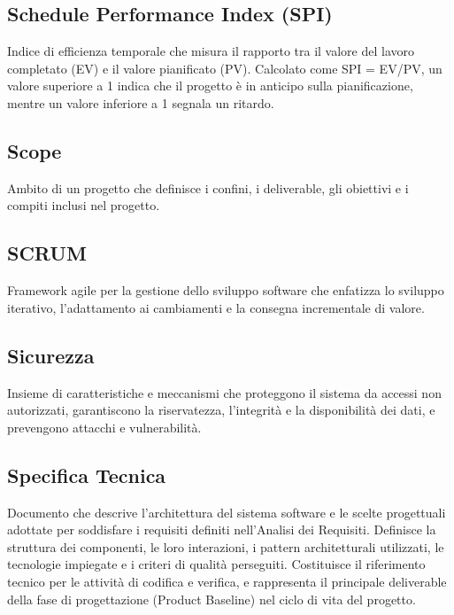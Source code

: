 \documentclass[a4paper,11pt]{article}
\begin{document}
\subsection{Schedule Performance Index (SPI)}
Indice di efficienza temporale che misura il rapporto tra il valore del lavoro completato (EV) e il valore pianificato (PV). Calcolato come SPI = EV/PV, un valore superiore a 1 indica che il progetto è in anticipo sulla pianificazione, mentre un valore inferiore a 1 segnala un ritardo.







\subsection{Scope}
Ambito di un progetto che definisce i confini, i deliverable, gli obiettivi e i compiti inclusi nel progetto.









\subsection{SCRUM}
Framework agile per la gestione dello sviluppo software che enfatizza lo sviluppo iterativo, l'adattamento ai cambiamenti e la consegna incrementale di valore.









\subsection{Sicurezza}
Insieme di caratteristiche e meccanismi che proteggono il sistema da accessi non autorizzati, garantiscono la riservatezza, l'integrità e la disponibilità dei dati, e prevengono attacchi e vulnerabilità.









\subsection{Specifica Tecnica}
Documento che descrive l'architettura del sistema software e le scelte progettuali adottate per soddisfare i requisiti definiti nell'Analisi dei Requisiti. Definisce la struttura dei componenti, le loro interazioni, i pattern architetturali utilizzati, le tecnologie impiegate e i criteri di qualità perseguiti. Costituisce il riferimento tecnico per le attività di codifica e verifica, e rappresenta il principale deliverable della fase di progettazione (Product Baseline) nel ciclo di vita del progetto.
\end{document}
